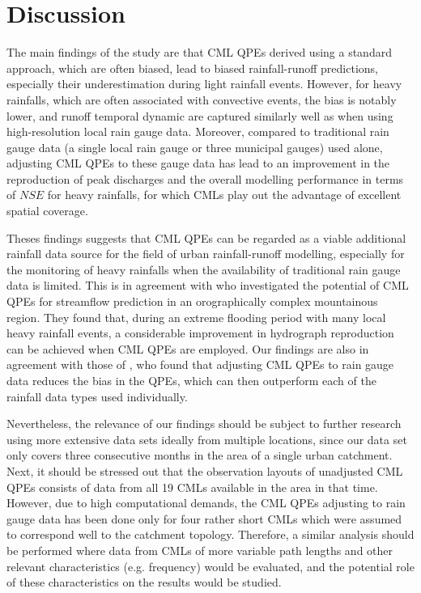 \documentclass{ctuthesis}\usepackage[]{graphicx}\usepackage[]{color}
\begin{document}
\section{Discussion}

The main findings of the study are that CML QPEs derived using a standard approach, which are often biased, lead to biased rainfall-runoff predictions, especially their underestimation during light rainfall events. However, for heavy rainfalls, which are often associated with convective events, the bias is notably lower, and runoff temporal dynamic are captured similarly well as when using high-resolution local rain gauge data. Moreover, compared to traditional rain gauge data (a single local rain gauge or three municipal gauges) used alone, adjusting CML QPEs to these gauge data has lead to an improvement in the reproduction of peak discharges and the overall modelling performance in terms of $N\!S\!E$ for heavy rainfalls, for which CMLs play out the advantage of excellent spatial coverage. 

Theses findings suggests that CML QPEs can be regarded as a viable additional rainfall data source for the field of urban rainfall-runoff modelling, especially for the monitoring of heavy rainfalls when the availability of traditional rain gauge data is limited. This is in agreement with \cite{smiatekPotentialCommercialMicrowave2017} who investigated the potential of CML QPEs for streamflow prediction in an orographically complex mountainous region. They found that, during an extreme flooding period with many local heavy rainfall events, a considerable improvement in hydrograph reproduction can be achieved when CML QPEs are employed. Our findings are also in agreement with those of \cite{fenclGaugeadjustedRainfallEstimates2017}, who found that adjusting CML QPEs to rain gauge data reduces the bias in the QPEs, which can then outperform each of the rainfall data types used individually.

Nevertheless, the relevance of our findings should be subject to further research using more extensive data sets ideally from multiple locations, since our data set only covers three consecutive months in the area of a single urban catchment. Next, it should be stressed out that the observation layouts of unadjusted CML QPEs consists of data from all 19 CMLs available in the area in that time. However, due to high computational demands, the CML QPEs adjusting to rain gauge data has been done only for four rather short CMLs which were assumed to correspond well to the catchment topology. Therefore, a similar analysis should be performed where data from CMLs of more variable path lengths and other relevant characteristics (e.g. frequency) would be evaluated, and the potential role of these characteristics on the results would be studied.
\end{document}
